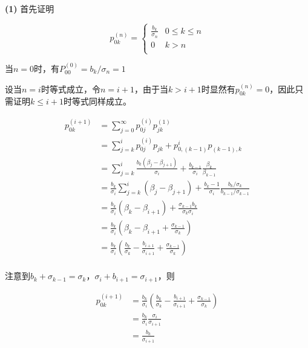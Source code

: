 \documentclass{../notes}
\begin{document}
\textbf{(1)} 首先证明

\begin{equation}
    p_{0k}^{(n)} = \begin{cases}
        \frac{b_k}{\sigma_n} & 0\leq k \leq n \\
        0                    & k > n          \\
    \end{cases}
\end{equation}

当$n=0$时，有$P_{00}^{(0)} = b_k/\sigma_n = 1$

设当$n = i$时等式成立，令$n = i + 1$，由于当$k > i+1$时显然有$p_{0k}^{(n)} = 0$，因此只需证明$k\leq i+1$时等式同样成立。

\begin{equation}
    \begin{aligned}
        p_{0k}^{(i+1)}
         & = \sum_{j=0}^{\infty} p_{0j}^{(i)}p_{jk}^{(1)}                                                                                            \\
         & = \sum_{j=k}^ip^{(i)}_{0j}p_{jk} + p_{0, (k-1)}^{i} p_{(k-1), k}                                                                          \\
         & = \sum_{j=k}^i \frac{b_k(\beta_{j} - \beta_{j+1})}{\sigma_i} + \frac{b_{k-1}}{\sigma_i} \frac{\beta_k}{\beta_{k-1}}                       \\
         & = \frac{b_k}{\sigma_i} \sum_{j=k}^i \left(\beta_j - \beta_{j+1}\right) + \frac{b_k-1}{\sigma_i} \frac{b_k/\sigma_k}{b_{k-1}/\sigma_{k-1}} \\
         & = \frac{b_k}{\sigma_i}\left(\beta_k - \beta_{i+1}\right) + \frac{\sigma_{k-1}b_k}{\sigma_k\sigma_i}                                       \\
         & = \frac{b_k}{\sigma_i}\left(\beta_k - \beta_{i+1} + \frac{\sigma_{k-1}}{\sigma_k}\right)                                                  \\
         & = \frac{b_k}{\sigma_i}\left(\frac{b_k}{\sigma_{k}} - \frac{b_{i+1}}{\sigma_{i+1}} + \frac{\sigma_{k-1}}{\sigma_k}\right)                  \\
    \end{aligned}
\end{equation}

注意到$b_{k} + \sigma_{k-1} = \sigma_{k}$，$\sigma_{i} + b_{i+1} = \sigma_{i+1}$，则

\begin{equation}
    \begin{aligned}
        p_{0k}^{(i+1)}
         & = \frac{b_k}{\sigma_i}\left(\frac{b_k}{\sigma_{k}} - \frac{b_{i+1}}{\sigma_{i+1}} + \frac{\sigma_{k-1}}{\sigma_k}\right) \\
         & = \frac{b_k}{\sigma_i}\frac{\sigma_i}{\sigma_{i+1}}                                                                      \\
         & = \frac{b_k}{\sigma_{i+1}}
    \end{aligned}
\end{equation}
\end{document}
